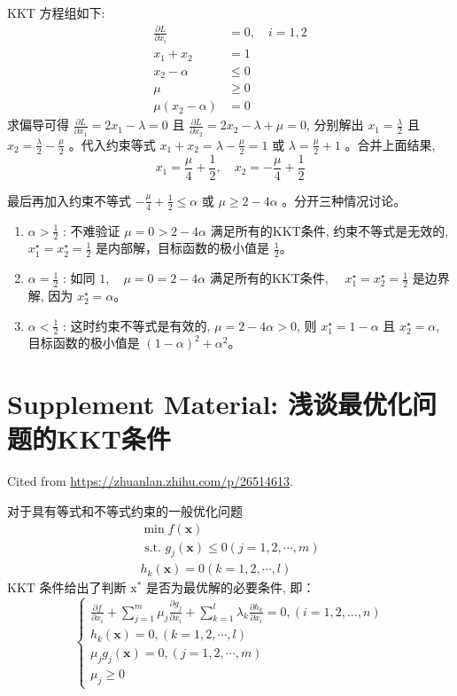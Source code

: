 KKT 方程组如下:
$$
\begin{aligned}
\frac{\partial L}{\partial x_{i}} &=0, \quad i=1,2 \\
x_{1}+x_{2} &=1 \\
x_{2}-\alpha & \leq 0 \\
\mu & \geq 0 \\
\mu\left(x_{2}-\alpha\right) &=0
\end{aligned}
$$
求偏导可得 $ \frac{\partial L}{\partial x_{1}}=2 x_{1}-\lambda=0 $ 且 $ \frac{\partial L}{\partial x_{2}}=2 x_{2}-\lambda+\mu=0 $, 分别解出 $ x_{1}=\frac{\lambda}{2} $ 且 $ x_{2}=\frac{\lambda}{2}-\frac{\mu}{2} $ 。代入约束等式 $ x_{1}+x_{2}=\lambda-\frac{\mu}{2}=1 $ 或 $ \lambda=\frac{\mu}{2}+1 $ 。合并上面结果,
$$
x_{1}=\frac{\mu}{4}+\frac{1}{2}, \quad x_{2}=-\frac{\mu}{4}+\frac{1}{2}
$$

最后再加入约束不等式 $ -\frac{\mu}{4}+\frac{1}{2} \leq \alpha $ 或 $ \mu \geq 2-4 \alpha $ 。分开三种情况讨论。

\begin{enumerate}
    \item $ \alpha>\frac{1}{2} $ : 不难验证 $ \mu=0>2-4 \alpha $ 满足所有的KKT条件, 约束不等式是无效的, $ x_{1}^{\star}=x_{2}^{\star}=\frac{1}{2} $ 是内部解，目标函数的极小值是 $ \frac{1}{2}$。
    \item $ \alpha=\frac{1}{2} $ : 如同 $ 1, \quad \mu=0=2-4 \alpha $ 满足所有的KKT条件, $ \quad x_{1}^{\star}=x_{2}^{\star}=\frac{1}{2} $ 是边界解, 因为 $ x_{2}^{\star}=\alpha $。
    \item $ \alpha<\frac{1}{2} $ : 这时约束不等式是有效的, $ \mu=2-4 \alpha>0 $, 则 $ x_{1}^{\star}=1-\alpha $ 且 $ x_{2}^{\star}=\alpha $, 目标函数的极小值是 $ (1-\alpha)^{2}+\alpha^{2} $。
\end{enumerate}

\section{Supplement Material: 浅谈最优化问题的KKT条件}

Cited from \url{https://zhuanlan.zhihu.com/p/26514613}.

\begin{theorem}[KKT条件]
    对于具有等式和不等式约束的一般优化问题
$$
\begin{array}{l}
\min f(\mathbf{x}) \\
\text { s.t. } g_{j}(\mathbf{x}) \leq 0(j=1,2, \cdots, m) \\
h_{k}(\mathbf{x})=0(k=1,2, \cdots, l)
\end{array}
$$
$ \mathrm{KKT} $ 条件给出了判断 $ \mathrm{x}^{*} $ 是否为最优解的必要条件, 即：
$$
\left\{\begin{array}{l}
\frac{\partial f}{\partial x_{i}}+\sum_{j=1}^{m} \mu_{j} \frac{\partial g_{j}}{\partial x_{i}}+\sum_{k=1}^{l} \lambda_{k} \frac{\partial h_{k}}{\partial x_{i}}=0,(i=1,2, \ldots, n) \\
h_{k}(\mathbf{x})=0,(k=1,2, \cdots, l) \\
\mu_{j} g_{j}(\mathbf{x})=0,(j=1,2, \cdots, m) \\
\mu_{j} \geq 0
\end{array}\right.
$$
\end{theorem}


